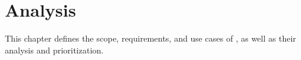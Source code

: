 \chapter{Analysis}
\label{chap:analysis}
This chapter defines the scope, requirements, and use cases of \this, as well as their analysis and prioritization.
